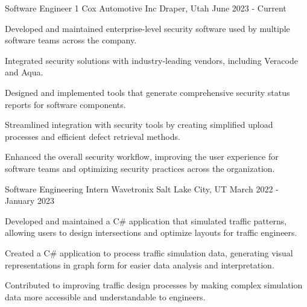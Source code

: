 


\begin{cventries}


\cventry
{Software Engineer 1} %
{Cox Automotive Inc} %
{Draper, Utah} %
{June 2023 - Current} %
{ %
\begin{cvitems}
\item {Developed and maintained enterprise-level security software used by multiple software teams across the company.}
\item {Integrated security solutions with industry-leading vendors, including Veracode and Aqua.}
\item {Designed and implemented tools that generate comprehensive security status reports for software components.}
\item {Streamlined integration with security tools by creating simplified upload processes and efficient defect retrieval methods.}
\item {Enhanced the overall security workflow, improving the user experience for software teams and optimizing security practices across the organization.}
\end{cvitems}
}


\cventry
{Software Engineering Intern} %
{Wavetronix} %
{Salt Lake City, UT} %
{March 2022 - January 2023} %
{ %
\begin{cvitems}
\item {Developed and maintained a C\# application that simulated traffic patterns, allowing users to design intersections and optimize layouts for traffic engineers.}
\item {Created a C\# application to process traffic simulation data, generating visual representations in graph form for easier data analysis and interpretation.}
\item {Contributed to improving traffic design processes by making complex simulation data more accessible and understandable to engineers.}
\end{cvitems}
}


\end{cventries}